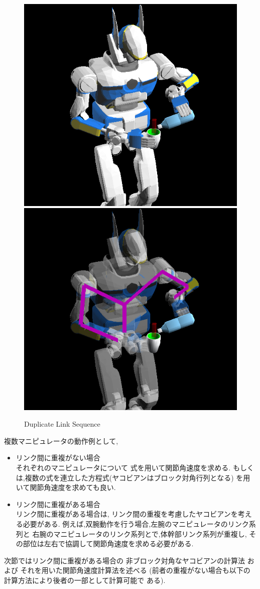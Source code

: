 \begin{figure}[htb]
  \begin{center}
    \includegraphics[width=0.49\columnwidth]{fig/normal.jpg}
    \includegraphics[width=0.49\columnwidth]{fig/linklist.jpg}
    \caption{Duplicate Link Sequence}
  \end{center}
\end{figure}

複数マニピュレータの動作例として,
\begin{itemize}
\item リンク間に重複がない場合\\
それぞれのマニピュレータについて
式を用いて関節角速度を求める.
もしくは,複数の式を連立した方程式(ヤコビアンはブロック対角行列となる)
を用いて関節角速度を求めても良い.
\item リンク間に重複がある場合\\
リンク間に重複がある場合は,
リンク間の重複を考慮したヤコビアンを考える必要がある.
例えば,双腕動作を行う場合,左腕のマニピュレータのリンク系列と
右腕のマニピュレータのリンク系列とで,体幹部リンク系列が重複し,
その部位は左右で協調して関節角速度を求める必要がある.
\end{itemize}
次節ではリンク間に重複がある場合の
非ブロック対角なヤコビアンの計算法
および
それを用いた関節角速度計算法を述べる
(前者の重複がない場合も以下の計算方法により後者の一部として計算可能で
ある).


